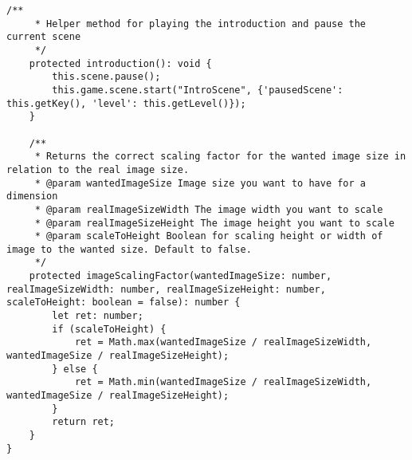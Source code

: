 \begin{lstlisting}[style=TypeScript, caption={baseScene.ts}]
    /**
     * Helper method for playing the introduction and pause the current scene
     */
    protected introduction(): void {
        this.scene.pause();
        this.game.scene.start("IntroScene", {'pausedScene': this.getKey(), 'level': this.getLevel()});
    }

    /**
     * Returns the correct scaling factor for the wanted image size in relation to the real image size.
     * @param wantedImageSize Image size you want to have for a dimension
     * @param realImageSizeWidth The image width you want to scale
     * @param realImageSizeHeight The image height you want to scale
     * @param scaleToHeight Boolean for scaling height or width of image to the wanted size. Default to false.
     */
    protected imageScalingFactor(wantedImageSize: number, realImageSizeWidth: number, realImageSizeHeight: number, scaleToHeight: boolean = false): number {
        let ret: number;
        if (scaleToHeight) {
            ret = Math.max(wantedImageSize / realImageSizeWidth, wantedImageSize / realImageSizeHeight);
        } else {
            ret = Math.min(wantedImageSize / realImageSizeWidth, wantedImageSize / realImageSizeHeight);
        }
        return ret;
    }
}
\end{lstlisting}


